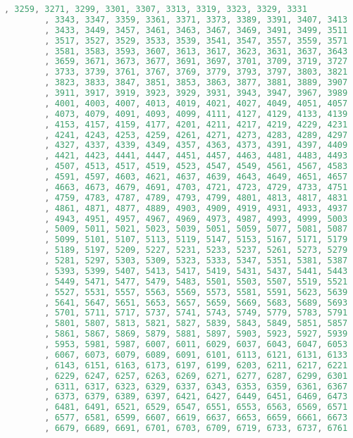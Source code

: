 \begin{solution}
\begin{lstlisting}[language=Java, caption="Java"]
		, 3259, 3271, 3299, 3301, 3307, 3313, 3319, 3323, 3329, 3331 
		, 3343, 3347, 3359, 3361, 3371, 3373, 3389, 3391, 3407, 3413 
		, 3433, 3449, 3457, 3461, 3463, 3467, 3469, 3491, 3499, 3511 
		, 3517, 3527, 3529, 3533, 3539, 3541, 3547, 3557, 3559, 3571 
		, 3581, 3583, 3593, 3607, 3613, 3617, 3623, 3631, 3637, 3643 
		, 3659, 3671, 3673, 3677, 3691, 3697, 3701, 3709, 3719, 3727 
		, 3733, 3739, 3761, 3767, 3769, 3779, 3793, 3797, 3803, 3821 
		, 3823, 3833, 3847, 3851, 3853, 3863, 3877, 3881, 3889, 3907 
		, 3911, 3917, 3919, 3923, 3929, 3931, 3943, 3947, 3967, 3989 
		, 4001, 4003, 4007, 4013, 4019, 4021, 4027, 4049, 4051, 4057 
		, 4073, 4079, 4091, 4093, 4099, 4111, 4127, 4129, 4133, 4139 
		, 4153, 4157, 4159, 4177, 4201, 4211, 4217, 4219, 4229, 4231 
		, 4241, 4243, 4253, 4259, 4261, 4271, 4273, 4283, 4289, 4297 
		, 4327, 4337, 4339, 4349, 4357, 4363, 4373, 4391, 4397, 4409 
		, 4421, 4423, 4441, 4447, 4451, 4457, 4463, 4481, 4483, 4493 
		, 4507, 4513, 4517, 4519, 4523, 4547, 4549, 4561, 4567, 4583 
		, 4591, 4597, 4603, 4621, 4637, 4639, 4643, 4649, 4651, 4657 
		, 4663, 4673, 4679, 4691, 4703, 4721, 4723, 4729, 4733, 4751 
		, 4759, 4783, 4787, 4789, 4793, 4799, 4801, 4813, 4817, 4831 
		, 4861, 4871, 4877, 4889, 4903, 4909, 4919, 4931, 4933, 4937 
		, 4943, 4951, 4957, 4967, 4969, 4973, 4987, 4993, 4999, 5003 
		, 5009, 5011, 5021, 5023, 5039, 5051, 5059, 5077, 5081, 5087 
		, 5099, 5101, 5107, 5113, 5119, 5147, 5153, 5167, 5171, 5179 
		, 5189, 5197, 5209, 5227, 5231, 5233, 5237, 5261, 5273, 5279 
		, 5281, 5297, 5303, 5309, 5323, 5333, 5347, 5351, 5381, 5387 
		, 5393, 5399, 5407, 5413, 5417, 5419, 5431, 5437, 5441, 5443 
		, 5449, 5471, 5477, 5479, 5483, 5501, 5503, 5507, 5519, 5521 
		, 5527, 5531, 5557, 5563, 5569, 5573, 5581, 5591, 5623, 5639 
		, 5641, 5647, 5651, 5653, 5657, 5659, 5669, 5683, 5689, 5693 
		, 5701, 5711, 5717, 5737, 5741, 5743, 5749, 5779, 5783, 5791 
		, 5801, 5807, 5813, 5821, 5827, 5839, 5843, 5849, 5851, 5857 
		, 5861, 5867, 5869, 5879, 5881, 5897, 5903, 5923, 5927, 5939 
		, 5953, 5981, 5987, 6007, 6011, 6029, 6037, 6043, 6047, 6053 
		, 6067, 6073, 6079, 6089, 6091, 6101, 6113, 6121, 6131, 6133 
		, 6143, 6151, 6163, 6173, 6197, 6199, 6203, 6211, 6217, 6221 
		, 6229, 6247, 6257, 6263, 6269, 6271, 6277, 6287, 6299, 6301 
		, 6311, 6317, 6323, 6329, 6337, 6343, 6353, 6359, 6361, 6367 
		, 6373, 6379, 6389, 6397, 6421, 6427, 6449, 6451, 6469, 6473 
		, 6481, 6491, 6521, 6529, 6547, 6551, 6553, 6563, 6569, 6571 
		, 6577, 6581, 6599, 6607, 6619, 6637, 6653, 6659, 6661, 6673 
		, 6679, 6689, 6691, 6701, 6703, 6709, 6719, 6733, 6737, 6761 

\end{lstlisting}
\end{solution}
